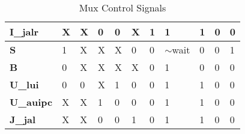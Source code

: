 \documentclass[12pt]{article}
\begin{document}
\begin{table}[ht]
{\begin{tabular}{|l|lllllll|l|l|l|}
            \textbf{I\_jalr}               & \multicolumn{1}{l|}{X}               & \multicolumn{1}{l|}{X}               & \multicolumn{1}{l|}{0}              & \multicolumn{1}{l|}{0}              & \multicolumn{1}{l|}{X}                & \multicolumn{1}{l|}{1}                & 1              & 1                            & 0                            & 0                            \\ \hline
            \textbf{S}                     & \multicolumn{1}{l|}{1}               & \multicolumn{1}{l|}{X}               & \multicolumn{1}{l|}{X}              & \multicolumn{1}{l|}{X}              & \multicolumn{1}{l|}{0}                & \multicolumn{1}{l|}{0}                & $\sim$wait     & 0                            & 0                            & 1                            \\ \hline
            \textbf{B}                     & \multicolumn{1}{l|}{0}               & \multicolumn{1}{l|}{X}               & \multicolumn{1}{l|}{X}              & \multicolumn{1}{l|}{X}              & \multicolumn{1}{l|}{X}                & \multicolumn{1}{l|}{0}                & 1              & 0                            & 0                            & 0                            \\ \hline
            \textbf{U\_lui}                & \multicolumn{1}{l|}{0}               & \multicolumn{1}{l|}{0}               & \multicolumn{1}{l|}{X}              & \multicolumn{1}{l|}{1}              & \multicolumn{1}{l|}{0}                & \multicolumn{1}{l|}{0}                & 1              & 1                            & 0                            & 0                            \\ \hline
            \textbf{U\_auipc}              & \multicolumn{1}{l|}{X}               & \multicolumn{1}{l|}{X}               & \multicolumn{1}{l|}{1}              & \multicolumn{1}{l|}{0}              & \multicolumn{1}{l|}{0}                & \multicolumn{1}{l|}{0}                & 1              & 1                            & 0                            & 0                            \\ \hline
            \textbf{J\_jal}                & \multicolumn{1}{l|}{X}               & \multicolumn{1}{l|}{X}               & \multicolumn{1}{l|}{0}              & \multicolumn{1}{l|}{0}              & \multicolumn{1}{l|}{1}                & \multicolumn{1}{l|}{0}                & 1              & 1                            & 0                            & 0                            \\ \hline
        \end{tabular}}
        \caption{Mux Control Signals}
        \label{table:mux_control_signals}
    \end{table}
    \newpage
\end{document}

